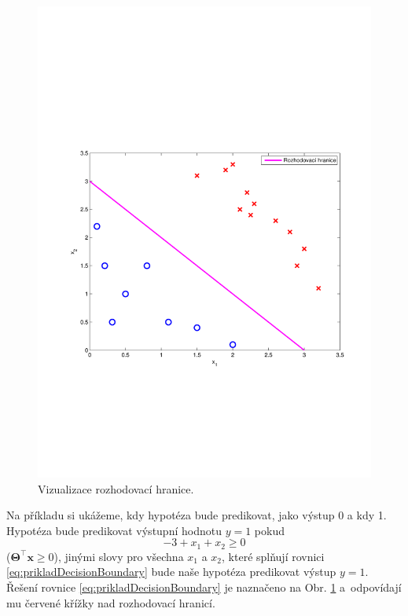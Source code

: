 \begin{figure}[!ht]
\begin{minipage}[b]{0.48\textwidth}
		\includegraphics[width = \textwidth, trim = 2.5cm 7cm 2cm 9cm]{./Img/BinarniRegrese/decisionBoundary/decisionBoundary2.pdf}
		\caption{Vizualizace rozhodovací hranice.}
		\label{fig:decisionBoundary2}
	\end{minipage}%
\end{figure}

\par{Na příkladu si ukážeme, kdy hypotéza bude predikovat, jako výstup 0 a kdy 1. Hypotéza bude predikovat výstupní hodnotu $y = 1$ pokud
\begin{equation}
	-3 + x_1 + x_2 \geq 0
	\label{eq:prikladDecisionBoundary}
\end{equation}
($\bm{\Theta}^{\top} \bm{x} \geq 0$), jinými slovy pro všechna $x_1$ a $x_2$, které splňují rovnici \ref{eq:prikladDecisionBoundary} bude naše hypotéza predikovat výstup $y = 1$. Řešení rovnice \ref{eq:prikladDecisionBoundary} je naznačeno na Obr. \ref{fig:decisionBoundary2} a~odpovídají mu červené křížky nad rozhodovací hranicí.}

